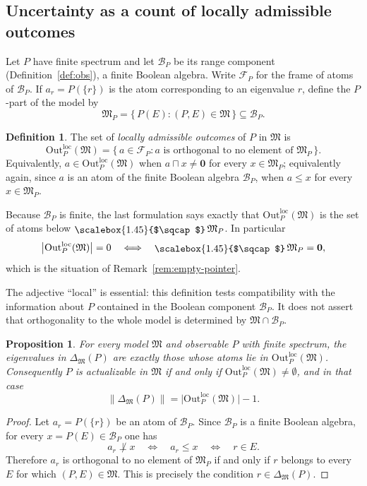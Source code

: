 \documentclass{article}   	%
\theoremstyle{plain}
\newtheorem{proposition}[theorem]{Proposition}
\theoremstyle{definition}
\newtheorem{definition}[theorem]{Definition}
\theoremstyle{remark}
\newcommand{\Outloc}[2]{\mathrm{Out}^{\mathrm{loc}}_{#1}(#2)}
\providecommand{\bigsqcap}{\mathop{\raisebox{-0.25ex}{\scalebox{1.45}{$\sqcap$}}}}
\begin{document}
\subsection{Uncertainty as a count of locally admissible outcomes}
\label{subsec:outcomes}

Let $P$ have finite spectrum and let $\mathcal B_P$ be its range component
(Definition~\ref{def:obs}), a finite Boolean algebra.  Write $\mathcal F_P$ for
the frame of atoms of $\mathcal B_P$.  If $a_r=P(\{r\})$ is the atom
corresponding to an eigenvalue $r$, define the $P$-part of the model by
\[
\mathfrak M_P
 =\{\,P(E):(P,E)\in\mathfrak M\,\}\subseteq\mathcal B_P.
\]

\begin{definition}
\label{def:outcomes}
The set of \emph{locally admissible outcomes} of $P$ in $\mathfrak M$ is
\[
\Outloc{P}{\mathfrak M}
 =\{\,a\in\mathcal F_P:
      a\text{ is orthogonal to no element of }\mathfrak M_P\,\}.
\]
Equivalently, $a\in\Outloc{P}{\mathfrak M}$ when
$a\sqcap x\neq\mathbf 0$ for every $x\in\mathfrak M_P$; equivalently again,
since $a$ is an atom of the finite Boolean algebra $\mathcal B_P$, when
$a\le x$ for every $x\in\mathfrak M_P$.
\end{definition}

Because $\mathcal B_P$ is finite, the last formulation says exactly that
$\Outloc{P}{\mathfrak M}$ is the set of atoms below
$\bigsqcap\mathfrak M_P$.  In particular
\[
\bigl|\Outloc{P}{\mathfrak M}\bigr|=0
\quad\Longleftrightarrow\quad
\bigsqcap\mathfrak M_P=\mathbf 0,
\]
which is the situation of Remark~\ref{rem:empty-pointer}.

The adjective ``local'' is essential: this definition tests compatibility
with the information about $P$ contained in the Boolean component
$\mathcal B_P$.  It does not assert that orthogonality to the whole model is
determined by $\mathfrak M\cap\mathcal B_P$.

\begin{proposition}
\label{prop:outcount}
For every model $\mathfrak M$ and observable $P$ with finite spectrum, the
eigenvalues in $\Delta_{\mathfrak M}(P)$ are exactly those whose atoms lie in
$\Outloc{P}{\mathfrak M}$.  Consequently $P$ is actualizable in
$\mathfrak M$ if and only if $\Outloc{P}{\mathfrak M}\ne\emptyset$, and in
that case
\[
\|\Delta_{\mathfrak M}(P)\|
 =\bigl|\Outloc{P}{\mathfrak M}\bigr|-1.
\]
\end{proposition}

\begin{proof}
Let $a_r=P(\{r\})$ be an atom of $\mathcal B_P$.  Since $\mathcal B_P$ is a
finite Boolean algebra, for every $x=P(E)\in\mathcal B_P$ one has
\[
a_r\not\perp x
\quad\Longleftrightarrow\quad
 a_r\le x
\quad\Longleftrightarrow\quad
 r\in E.
\]
Therefore $a_r$ is orthogonal to no element of $\mathfrak M_P$ if and only if
$r$ belongs to every $E$ for which $(P,E)\in\mathfrak M$.  This is precisely
the condition $r\in\Delta_{\mathfrak M}(P)$.
\end{proof}
\end{document}
